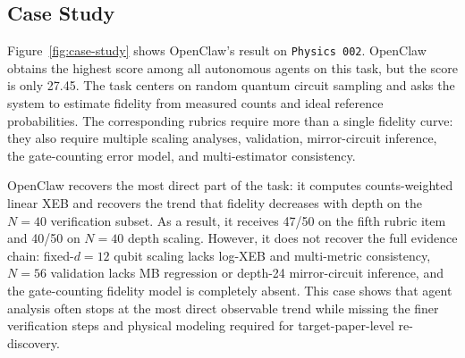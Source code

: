 \subsection{Case Study}

Figure~\ref{fig:case-study} shows OpenClaw's result on \texttt{Physics 002}. OpenClaw obtains the highest score among all autonomous agents on this task, but the score is only 27.45. The task centers on random quantum circuit sampling and asks the system to estimate fidelity from measured counts and ideal reference probabilities. The corresponding rubrics require more than a single fidelity curve: they also require multiple scaling analyses, validation, mirror-circuit inference, the gate-counting error model, and multi-estimator consistency.

OpenClaw recovers the most direct part of the task: it computes counts-weighted linear XEB and recovers the trend that fidelity decreases with depth on the \(N=40\) verification subset. As a result, it receives 47/50 on the fifth rubric item and 40/50 on \(N=40\) depth scaling. However, it does not recover the full evidence chain: fixed-\(d=12\) qubit scaling lacks log-XEB and multi-metric consistency, \(N=56\) validation lacks MB regression or depth-24 mirror-circuit inference, and the gate-counting fidelity model is completely absent. This case shows that agent analysis often stops at the most direct observable trend while missing the finer verification steps and physical modeling required for target-paper-level re-discovery.
